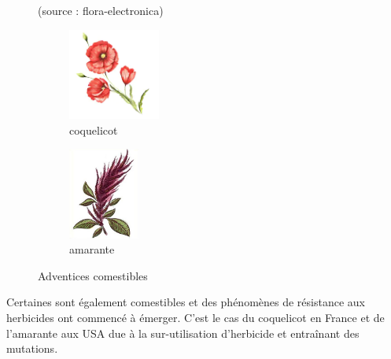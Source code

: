 \documentclass[../thesis.tex]{subfiles}
\begin{document}
    \begin{figure}[H]
        \centering
        {\scriptsize (source : flora-electronica)} \\
        \begin{subfigure}{0.2\linewidth}
            \includegraphics[height=3cm]{img/intro/plante-coquelicot.jpg}
            \caption{coquelicot}
        \end{subfigure}
        \hspace{1cm}
        \begin{subfigure}{0.2\linewidth}
            \includegraphics[height=3cm]{img/intro/plante-amarante}
            \caption{amarante}
        \end{subfigure}
        \caption{Adventices comestibles}
        \label{fig:02-adventice-comestible}
    \end{figure}
    
    Certaines sont également comestibles et des phénomènes de résistance aux herbicides ont commencé à émerger.
    C'est le cas du coquelicot en France et de l'amarante aux USA due à la sur-utilisation d'herbicide et entraînant des mutations.
    
\end{document}

